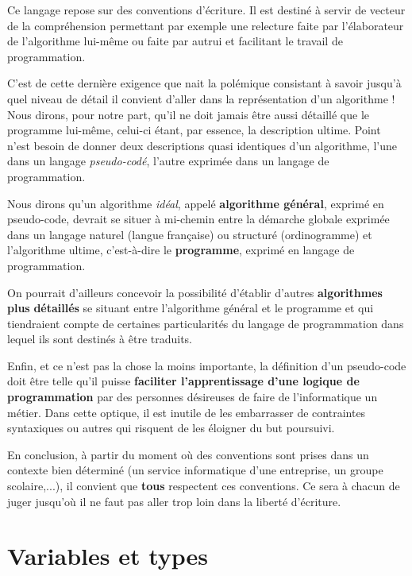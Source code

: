 		Ce langage repose sur des conventions d’écriture. Il est destiné à
		servir de vecteur de la compréhension permettant par exemple une
		relecture faite par l’élaborateur de l’algorithme lui-même ou faite par
		autrui et facilitant le travail de programmation.

		C’est de cette dernière exigence que nait la polémique consistant à
		savoir jusqu’à quel niveau de détail il convient d’aller dans la
		représentation d’un algorithme ! Nous dirons, pour notre part, qu’il ne
		doit jamais être aussi détaillé que le programme lui-même, celui-ci
		étant, par essence, la description ultime. Point n’est besoin de donner
		deux descriptions quasi identiques d’un algorithme, l’une dans un
		langage \textit{pseudo-codé}, l’autre exprimée dans un langage de
		programmation.

		Nous dirons qu’un algorithme \textit{idéal}, appelé \textbf{algorithme
		général}, exprimé en pseudo-code, devrait se situer à mi-chemin entre
		la démarche globale exprimée dans un langage naturel (langue française)
		ou structuré (ordinogramme) et l’algorithme ultime, c’est-à-dire le
		\textbf{programme}, exprimé en langage de programmation.

		On pourrait d’ailleurs concevoir la possibilité d’établir d’autres
		\textbf{algorithmes plus }\textbf{détaillés} se situant entre
		l’algorithme général et le programme et qui tiendraient compte de
		certaines particularités du langage de programmation dans lequel ils
		sont destinés à être traduits.

		Enfin, et ce n’est pas la chose la moins importante, la définition d’un
		pseudo-code doit être telle qu’il puisse \textbf{faciliter
		l’apprentissage d’une logique de programmation} par des personnes
		désireuses de faire de l’informatique un métier. Dans cette optique, il
		est inutile de les embarrasser de contraintes syntaxiques ou autres qui
		risquent de les éloigner du but poursuivi.

		En conclusion, à partir du moment où des conventions sont prises dans un
		contexte bien déterminé (un service informatique d’une entreprise, un
		groupe scolaire,...), il convient que \textbf{tous }respectent ces
		conventions. Ce sera à chacun de juger jusqu’où il ne faut pas aller
		trop loin dans la liberté d’écriture.

	\section{Variables et types}

